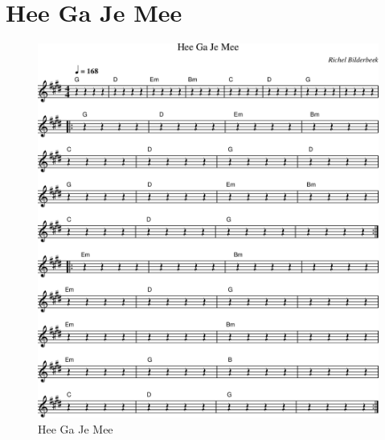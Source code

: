 \chapter{Hee Ga Je Mee}



\begin{figure}[!htbp]
  \includegraphics[width=\textwidth,height=\textheight,keepaspectratio]{../songs/58_hee_ga_je_mee.png}
  \caption{Hee Ga Je Mee}
  \label{fig:58_hee_ga_je_mee}
\end{figure}
